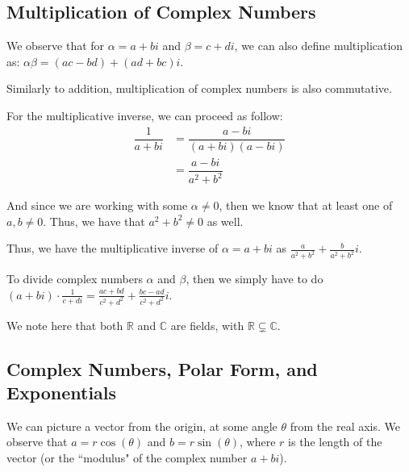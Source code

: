 \documentclass[openany]{book}
\newcommand{\CC}{\mathbb{C}}
\newcommand{\RR}{\mathbb{R}}
\begin{document}
	\subsection{Multiplication of Complex Numbers}
	We observe that for $\alpha = a + bi$ and $\beta = c + di$, we can also define multiplication as: $\alpha\beta = (ac - bd) + (ad + bc)i$.
	
	Similarly to addition, multiplication of complex numbers is also commutative.
	
	For the multiplicative inverse, we can proceed as follow:
	\begin{align*}
		\dfrac{1}{a+bi} &= \dfrac{a-bi}{(a+bi)(a-bi)} \\
		&= \dfrac{a-bi}{a^{2} + b^{2}}
	\end{align*}
	
	And since we are working with some $\alpha \not= 0$, then we know that at least one of $a,b \not= 0$. Thus, we have that $a^{2} + b^{2} \not= 0$ as well.
	
	Thus, we have the multiplicative inverse of $\alpha = a + bi$ as $\frac{a}{a^{2} + b^{2}} + \frac{b}{a^{2} + b^{2}}i$.
	
	To divide complex numbers $\alpha$ and $\beta$, then we simply have to do $(a+bi) \cdot \frac{1}{c+di} = \frac{ac + bd}{c^{2} + d^{2}} + \frac{bc - ad}{c^{2} + d^{2}}i$.
	
	We note here that both $\RR$ and $\CC$ are fields, with $\RR \subsetneq \CC$.
	
	\subsection{Complex Numbers, Polar Form, and Exponentials}
	
	We can picture a vector from the origin, at some angle $\theta$ from the real axis. We observe that $a = r\cos(\theta)$ and $b = r\sin(\theta)$, where $r$ is the length of the vector (or the ``modulus" of the complex number $a+bi$). 
	
\end{document}
